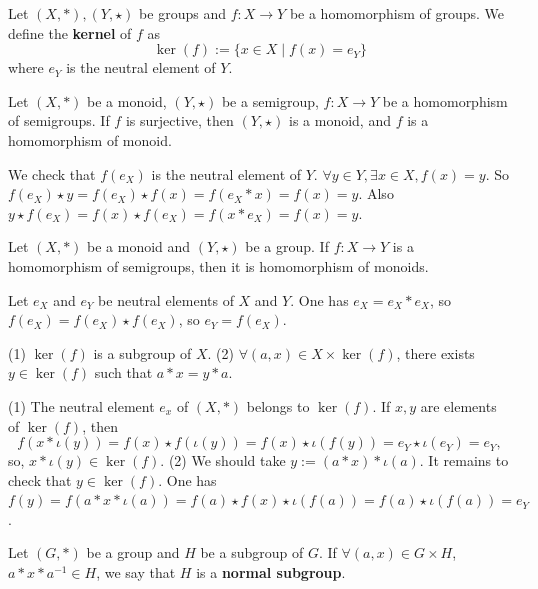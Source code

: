 \begin{definitionenv}
    Let $(X, *), (Y, \star)$ be groups and $f:X\rightarrow Y$ be a homomorphism of groups. We define the \textbf{kernel} of $f$ as 
    $$\ker(f):=\{x\in X\mid f(x)=e_Y\}$$
    where $e_Y$ is the neutral element of $Y$.
\end{definitionenv}
\begin{propositionenv}
    Let $(X, *)$ be a monoid,  $(Y, \star)$ be a semigroup,  $f:X\rightarrow Y$ be a homomorphism of semigroups. If $f$ is surjective,  then $(Y, \star)$ is a monoid,  and $f$ is a homomorphism of monoid.
\end{propositionenv}
\begin{proofenv}
    We check that $f(e_X)$ is the neutral element of $Y$. $\forall y\in Y, \exists x\in X, f(x)=y$. So $f(e_X)\star y=f(e_X)\star f(x)=f(e_X*x)=f(x)=y$. Also $y\star f(e_X)=f(x)\star f(e_X)=f(x*e_X)=f(x)=y$.
\end{proofenv}
\begin{propositionenv}
    Let $(X, *)$ be a monoid and $(Y, \star)$ be a group. If $f:X\rightarrow Y$ is a homomorphism of semigroups,  then it is homomorphism of monoids.
\end{propositionenv}
\begin{proofenv}
    Let $e_X$ and $e_Y$ be neutral elements of $X$ and $Y$. One has $e_X=e_X*e_X$,  so $f(e_X)=f(e_X)\star f(e_X)$,  so $e_Y=f(e_X)$.
\end{proofenv}
\begin{propositionenv}
    \quad
    \newline
    (1) $\ker(f)$ is a subgroup of $X$.
    \newline
    (2) $\forall (a, x)\in X\times \ker(f) $,  there exists $y\in \ker(f)$ such that $a*x=y*a$.
\end{propositionenv}
\begin{proofenv}
    \quad
    \newline
    (1) The neutral element $e_x$ of $(X, *)$ belongs to $\ker(f)$. If $x, y$ are elements of $\ker(f)$,  then 
    $$f(x*\iota(y))=f(x)\star f(\iota(y))=f(x)\star \iota(f(y))=e_Y\star\iota(e_Y)=e_Y, $$
    so,  $x*\iota(y)\in \ker(f)$.
    \newline
    (2) We should take $y:=(a*x)*\iota(a)$. It remains to check that $y\in \ker(f)$. One has $f(y)=f(a*x*\iota(a))=f(a)\star f(x)\star \iota(f(a))=f(a)\star \iota(f(a))=e_Y$.
\end{proofenv}
\begin{definitionenv}
    Let $(G, *)$ be a group and $H$ be a subgroup of $G$. If $\forall (a, x)\in G\times H$,  $a*x*a^{-1}\in H$,  we say that $H$ is a \textbf{normal subgroup}.
\end{definitionenv}
